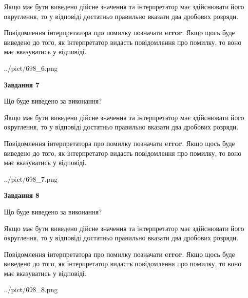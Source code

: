 \documentclass[12pt, ukrainian]{article}
\begin{document}
{\begin {Large}
Якщо має бути виведено дійсне значення та інтерпретатор має здійснювати його округлення, 
то у відповіді достатньо правильно вказати два дробових розряди.

Повідомлення інтерпретатора про помилку позначати \textbf{error}.
Якщо щось буде виведено до того, як інтерпретатор видасть повідомлення про помилку, 
то воно має вказуватись у відповіді. \par

\begin{center}
	{../pict/698_6.png}
\end{center}
\newpage

{\begin {center}\textbf{Завдання 7}\end {center}}\par
Що буде виведено за виконання? \par

Якщо має бути виведено дійсне значення та інтерпретатор має здійснювати його округлення, 
то у відповіді достатньо правильно вказати два дробових розряди.

Повідомлення інтерпретатора про помилку позначати \textbf{error}.
Якщо щось буде виведено до того, як інтерпретатор видасть повідомлення про помилку, 
то воно має вказуватись у відповіді. \par

\begin{center}
	{../pict/698_7.png}
\end{center}
\newpage

{\begin {center}\textbf{Завдання 8}\end {center}}\par
Що буде виведено за виконання? \par

Якщо має бути виведено дійсне значення та інтерпретатор має здійснювати його округлення, 
то у відповіді достатньо правильно вказати два дробових розряди.

Повідомлення інтерпретатора про помилку позначати \textbf{error}.
Якщо щось буде виведено до того, як інтерпретатор видасть повідомлення про помилку, 
то воно має вказуватись у відповіді. \par

\begin{center}
	{../pict/698_8.png}
\end{center}
\newpage


\end{Large}}
\end{document}
